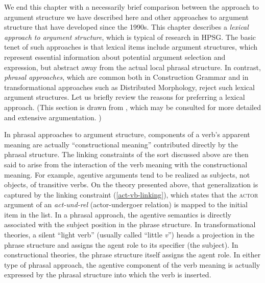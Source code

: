\documentclass[output=paper
 	        ,biblatex
                ,babelshorthands
                ,newtxmath
                ,draftmode
                ,colorlinks, citecolor=brown
]{langscibook}
\begin{document}
We end this chapter with a necessarily brief comparison between the approach to argument structure we have described here and other approaches to argument structure that have developed since the 1990s.
This chapter describes a \textit{lexical approach to argument structure}, which is typical of research in HPSG.  The basic tenet of such approaches is that lexical items include argument structures, which represent essential information about potential argument selection and expression, but
abstract away from the actual local phrasal structure.  In contrast, \emph{phrasal approaches}, which
are common both in Construction Grammar and in transformational approaches such as Distributed Morphology, reject such lexical argument structures.   Let us briefly review the reasons for preferring a lexical approach. (This section is drawn from \citealt{MWArgSt}, which may be consulted for more detailed and extensive argumentation. ) 

In phrasal approaches to argument structure, components of a verb's apparent meaning are actually ``constructional meaning'' contributed directly by the phrasal structure.  The linking constraints of the sort discussed above are then said to arise from the interaction of the verb meaning with the constructional meaning.  For example, agentive arguments tend to be realized as subjects, not objects, of transitive verbs.  On the theory presented above, that generalization is captured by the linking constraint (\ref{act-vb-linking}), which states that the \textsc{actor} argument of an \textit{act-und-rel} (actor-undergoer relation) is mapped to the initial item in the \argst list.  In a phrasal approach, the agentive semantics is directly associated with the subject position in the phrase structure.  In transformational theories, a silent ``light verb'' (usually called ``little \textit{v}'') heads a projection in the phrase structure and assigns the agent role to its specifier (the subject).  In constructional theories, the phrase structure itself assigns the agent role.  In either type of phrasal approach, the agentive component of the verb meaning is actually expressed by the phrasal structure into which the verb is inserted.  
\end{document}

